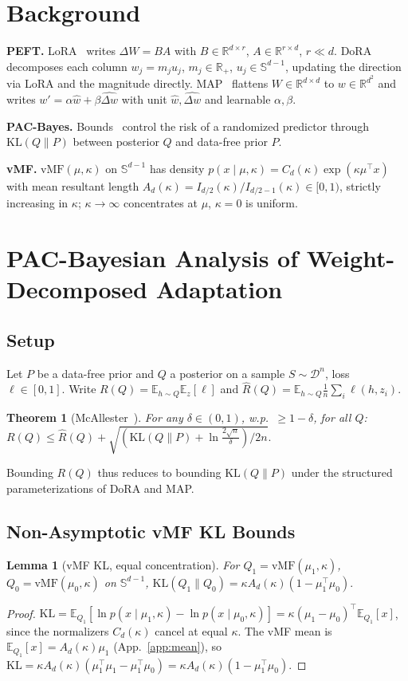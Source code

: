 \documentclass[11pt]{article}
\newtheorem{theorem}{Theorem}
\newtheorem{lemma}{Lemma}
\newcommand{\KL}{\mathrm{KL}}
\newcommand{\vMF}{\mathrm{vMF}}
\newcommand{\Risk}{R}
\newcommand{\eRisk}{\hat{R}}
\newcommand{\Sd}{\mathbb{S}^{d-1}}
\newcommand{\E}{\mathbb{E}}
\newcommand{\R}{\mathbb{R}}
\begin{document}
\section{Background}
\textbf{PEFT.} LoRA~\cite{lora} writes $\Delta W=BA$ with $B\in\R^{d\times r}$,
$A\in\R^{r\times d}$, $r\ll d$. DoRA~\cite{dora} decomposes each column
$w_j=m_j u_j$, $m_j\in\R_+$, $u_j\in\Sd$, updating the direction via LoRA and the
magnitude directly. MAP~\cite{map} flattens $W\in\R^{d\times d}$ to $w\in\R^{d^2}$ and
writes $w'=\alpha\hat w+\beta\widehat{\Delta w}$ with unit $\hat w,\widehat{\Delta w}$
and learnable $\alpha,\beta$.

\textbf{PAC-Bayes.} Bounds~\cite{mcallester,catoni} control the risk of a randomized
predictor through $\KL(Q\|P)$ between posterior $Q$ and data-free prior $P$.

\textbf{vMF.} $\vMF(\mu,\kappa)$ on $\Sd$ has density
$p(x\mid\mu,\kappa)=C_d(\kappa)\exp(\kappa\mu^\top x)$ with mean resultant length
$A_d(\kappa)=I_{d/2}(\kappa)/I_{d/2-1}(\kappa)\in[0,1)$, strictly increasing in
$\kappa$; $\kappa\to\infty$ concentrates at $\mu$, $\kappa=0$ is uniform.

\section{PAC-Bayesian Analysis of Weight-Decomposed Adaptation}

\subsection{Setup}
Let $P$ be a data-free prior and $Q$ a posterior on a sample $S\sim\mathcal{D}^n$,
loss $\ell\in[0,1]$. Write $\Risk(Q)=\E_{h\sim Q}\E_z[\ell]$ and
$\eRisk(Q)=\E_{h\sim Q}\frac1n\sum_i\ell(h,z_i)$.

\begin{theorem}[McAllester~\cite{mcallester}]\label{thm:mcallester}
For any $\delta\in(0,1)$, w.p.\ $\ge1-\delta$, for all $Q$:
$\Risk(Q)\le\eRisk(Q)+\sqrt{(\KL(Q\|P)+\ln\tfrac{2\sqrt n}{\delta})/2n}.$
\end{theorem}
Bounding $\Risk(Q)$ thus reduces to bounding $\KL(Q\|P)$ under the structured
parameterizations of DoRA and MAP.

\subsection{Non-Asymptotic vMF KL Bounds}

\begin{lemma}[vMF KL, equal concentration]\label{lem:vmfkl}
For $Q_1=\vMF(\mu_1,\kappa)$, $Q_0=\vMF(\mu_0,\kappa)$ on $\Sd$,
$\KL(Q_1\|Q_0)=\kappa A_d(\kappa)(1-\mu_1^\top\mu_0).$
\end{lemma}
\begin{proof}
$\KL=\E_{Q_1}[\ln p(x\mid\mu_1,\kappa)-\ln p(x\mid\mu_0,\kappa)]
=\kappa(\mu_1-\mu_0)^\top\E_{Q_1}[x]$, since the normalizers $C_d(\kappa)$ cancel at
equal $\kappa$. The vMF mean is $\E_{Q_1}[x]=A_d(\kappa)\mu_1$ (App.~\ref{app:mean}),
so $\KL=\kappa A_d(\kappa)(\mu_1^\top\mu_1-\mu_1^\top\mu_0)=\kappa A_d(\kappa)(1-\mu_1^\top\mu_0)$.
\end{proof}
\end{document}
